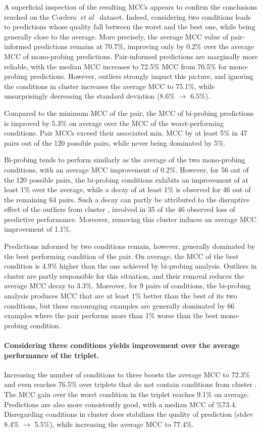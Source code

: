 \documentclass[a4,center,fleqn]{NAR}
\begin{document}
A superficial inspection of the resulting MCCs appears to confirm the conclusions reached on the Cordero~\emph{et al}~\cite{Cordero2012} dataset. Indeed, considering two conditions leads to predictions whose quality fall between the worst and the best one, while being generally close to the average. More precisely, the average MCC value of pair-informed predictions remains at 70.7\%, improving only by 0.2\% over the average MCC of mono-probing predictions. Pair-informed predictions are marginally more reliable, with the median MCC increases to 72.5\% MCC from 70.5\% for mono-probing predictions. However, outliers strongly impact this picture, and ignoring the conditions in cluster  increases the average MCC to 75.1\%, while unsurprisingly decreasing the standard deviation (8.6\% $\to$ 6.5\%).

Compared to the minimum MCC of the pair, the MCC of bi-probing predictions is improved by 5.3\% on average over the MCC of the worst-performing conditions. Pair MCCs exceed their associated min. MCC by at least 5\% in 47 pairs out of the 120 possible pairs, while never being dominated by 5\%. 

Bi-probing tends to perform similarly as the average of the two mono-probing conditions, with an average MCC improvement of 0.2\%. However, for 56 out of the 120 possible pairs, the bi-probing conditions exhibits an improvement of at least 1\% over the average, while a decay of at least 1\% is observed for 46 out of the remaining 64 pairs. Such a decay can partly be attributed to the disruptive effect of the outliers from cluster , involved in 35 of the 46 observed loss of predictive performance. Moreover, removing this cluster induces an average MCC improvement of 1.1\%.

Predictions informed by two conditions remain, however, generally dominated by the best performing condition of the pair. On average, the MCC of the best condition is 4.9\% higher than the one achieved by bi-probing analysis. 
Outliers in cluster  are partly responsible for this situation, and their removal reduces the average MCC decay to 3.3\%. Moreover, for 9 pairs of conditions, the bi-probing analysis produces MCC that are at least 1\% better than the best of its two conditions, but these encouraging examples are generally dominated by 66 examples where the pair performs more than 1\% worse than the best mono-probing condition.

\paragraph{Considering three conditions yields improvement over the average performance of the triplet.}
Increasing the number of conditions to three boosts the average MCC to 72.3\% and even reaches 76.5\% over triplets that do not contain conditions from cluster . The MCC gain over the worst condition in the triplet reaches 9.1\% on average.  Predictions are also more consistently good, with a median MCC of \%73.4. Disregarding conditions in cluster  does stabilizes the quality of prediction (stdev 8.4\% $\to$ 5.5\%), while increasing the average MCC to 77.4\%.
\end{document}
